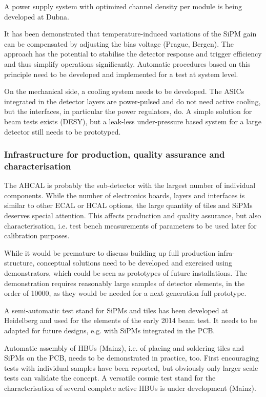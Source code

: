 A power supply system with optimized channel density per module is being developed at Dubna.

It has been demonstrated that temperature-induced variations of the SiPM gain can be compensated by adjusting the bias voltage (Prague, Bergen). The approach has the potential to stabilise the detector response and trigger efficiency and thus simplify operations significantly. Automatic procedures based on this principle need to be developed and implemented for a test at system level.

On the mechanical side, a cooling system needs to be developed. The ASICs integrated in the detector layers are power-pulsed and do not need active cooling, but the interfaces, in particular the power regulators, do. A simple solution for beam tests exists (DESY), but a leak-less under-pressure based system for a large detector still needs to be prototyped.

\subsubsection{Infrastructure for production, quality assurance and characterisation}

The AHCAL is probably the sub-detector with the largest number of individual components. While the number of electronics boards, layers and interfaces is similar to other ECAL or HCAL options, the large quantity of tiles and SiPMs deserves special attention. This affects production and quality assurance, but also characterisation, i.e. test bench measurements of parameters to be used later for calibration purposes.

While it would be premature to discuss building up full production infra-structure, conceptual solutions need to be developed and exercised using demonstrators, which could be seen as prototypes of future installations. The demonstration requires reasonably large samples of detector elements, in the order of 10000, as they would be needed for a next generation full prototype.

A semi-automatic test stand for SiPMs and tiles has been developed at Heidelberg and used for the elements of the early 2014 beam test. It needs to be adapted for future designs, e.g. with SiPMs integrated in the PCB.

Automatic assembly of HBUs (Mainz), i.e. of placing and soldering tiles and SiPMs on the PCB, needs to be demonstrated in practice, too. First encouraging tests with individual samples have been reported, but obviously only larger scale tests can validate the concept. A versatile cosmic test stand for the characterisation of several complete active HBUs is under development (Mainz).

